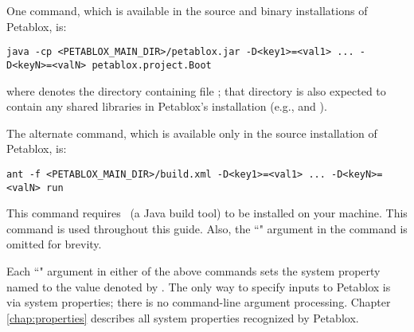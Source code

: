 One command, which is available in the source and binary installations of
Petablox, is:

\begin{framed}
\begin{verbatim}
java -cp <PETABLOX_MAIN_DIR>/petablox.jar -D<key1>=<val1> ... -D<keyN>=<valN> petablox.project.Boot
\end{verbatim}
\end{framed}

where  denotes the directory containing file
; that directory is also expected to contain any shared
libraries in Petablox's installation (e.g.,  and
).

The alternate command, which is available only in the source installation of
Petablox, is:

\begin{framed}
\begin{verbatim}
ant -f <PETABLOX_MAIN_DIR>/build.xml -D<key1>=<val1> ... -D<keyN>=<valN> run
\end{verbatim}
\end{framed}

This command requires \ant\ (a Java build tool) to be installed on your
machine.  This command is used throughout this guide.  Also, the
``" argument in the command is omitted
for brevity.

Each ``" argument in either of the above commands sets the
system property named  to the value denoted by .  The
only way to specify inputs to Petablox is via system properties; there is no
command-line argument processing.  Chapter \ref{chap:properties} describes all
system properties recognized by Petablox.

